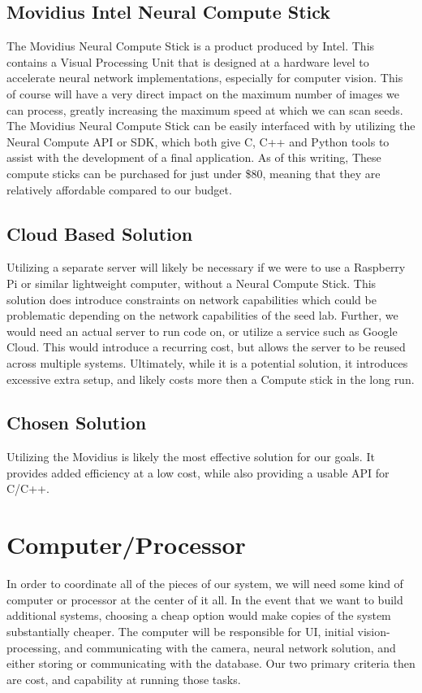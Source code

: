 \documentclass[onecolumn, draftclsnofoot,10pt, compsoc]{IEEEtran}
\begin{document}
\subsection{Movidius Intel Neural Compute Stick}
The Movidius Neural Compute Stick is a product produced by Intel. This contains a Visual Processing Unit that is designed at a hardware level to accelerate neural network implementations, especially for computer vision. \cite{intel} This of course will have a very direct impact on the maximum number of images we can process, greatly increasing the maximum speed at which we can scan seeds. The Movidius Neural Compute Stick can be easily interfaced with by utilizing the Neural Compute API or SDK, which both give C, C++ and Python tools to assist with the development of a final application. \cite{intelintro} As of this writing, These compute sticks can be purchased for just under \$80, meaning that they are relatively affordable compared to our budget.

\subsection{Cloud Based Solution}
Utilizing a separate server will likely be necessary if we were to use a Raspberry Pi or similar lightweight computer, without a Neural Compute Stick. This solution does introduce constraints on network capabilities which could be problematic depending on the network capabilities of the seed lab. Further, we would need an actual server to run code on, or utilize a  service such as Google Cloud. This would introduce a recurring cost, but allows the server to be reused across multiple systems. Ultimately, while it is a potential solution, it introduces excessive extra setup, and likely costs more then a Compute stick in the long run.
\subsection{Chosen Solution}
Utilizing the Movidius is likely the most effective solution for our goals. It provides added efficiency at a low cost, while also providing a usable API for C/C++.

\section{Computer/Processor}
In order to coordinate all of the pieces of our system, we will need some kind of computer or processor at the center of it all. In the event that we want to build additional systems, choosing a cheap option would make copies of the system substantially cheaper. The computer will be responsible for UI, initial vision-processing, and communicating with the camera, neural network solution, and either storing or communicating with the database. Our two primary criteria then are cost, and capability at running those tasks.
\end{document}
